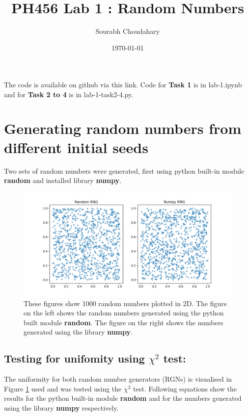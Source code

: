 \documentclass{article}
\title{PH456 Lab 1 : Random Numbers} %
\author{Sourabh Choudahary} %
\date{\today} %
\begin{document}
    
\maketitle %

The code is available on github via this link. 
Code for \textbf{Task 1} is in lab-1.ipynb and for \textbf{Task 2 to 4} is in lab-1-task2-4.py.

\section{Generating random numbers from different initial seeds} %
    
Two sets of random numbers were generated, first using python built-in module \textbf{random} 
and installed library \textbf{numpy}.

\begin{figure}[H]\label{fig:RNGs2D}
    \centering
    \includegraphics[scale = 0.5]{task1.png}
    \caption[Random Numbers]{These figures show 1000 random numbers plotted in 2D. The figure
    on the left shows the random numbers generated using the python built module \textbf{random}. 
    The figure on the right shows the numbers generated using the library \textbf{numpy}.}
\end{figure}

\subsection{Testing for unifomity using $ \chi^2 $ test:}

The uniformity for both random number generators (RGNs) is visualised in Figure \ref{fig:RNGs2D} used 
and was tested using the $ \chi^2 $ test. Following equations show the results for the python 
built-in module \textbf{random} and for the numbers generated using the library \textbf{numpy} 
respectively. 
\end{document}
